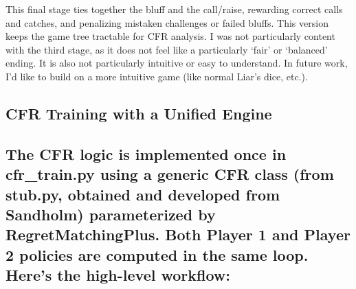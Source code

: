 \documentclass[
]{article}
\begin{document}
This final stage ties together the bluff and the call/raise, rewarding
correct calls and catches, and penalizing mistaken challenges or failed
bluffs. This version keeps the game tree tractable for CFR analysis. I
was not particularly content with the third stage, as it does not feel
like a particularly `fair' or `balanced' ending. It is also not
particularly intuitive or easy to understand. In future work, I'd like
to build on a more intuitive game (like normal Liar's dice, etc.).

\subsection{\texorpdfstring{\textbf{CFR Training with a Unified
Engine}}{CFR Training with a Unified Engine}}\label{cfr-training-with-a-unified-engine}

\subsection{\texorpdfstring{ The CFR logic is implemented once in
cfr\_train.py using a generic CFR class (from stub.py, obtained and
developed from Sandholm) parameterized by RegretMatchingPlus. Both
Player 1 and Player 2 policies are computed in the same loop. Here's the
high-level
workflow:}{ The CFR logic is implemented once in cfr\_train.py using a generic CFR class (from stub.py, obtained and developed from Sandholm) parameterized by RegretMatchingPlus. Both Player 1 and Player 2 policies are computed in the same loop. Here's the high-level workflow:}}\label{the-cfr-logic-is-implemented-once-in-cfr_train.py-using-a-generic-cfr-class-from-stub.py-obtained-and-developed-from-sandholm-parameterized-by-regretmatchingplus.-both-player-1-and-player-2-policies-are-computed-in-the-same-loop.-heres-the-high-level-workflow}
\end{document}
